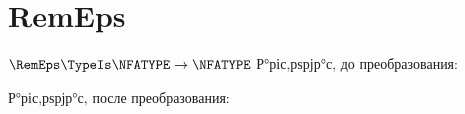 \section{RemEps}
\begin{frame}{$\RemEps\TypeIs\NFATYPE\to\NFATYPE$}
	Р°ріс‚рѕрјр°с‚ до преобразования:

	Р°ріс‚рѕрјр°с‚ после преобразования:
\end{frame}